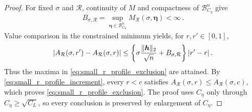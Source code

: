 \documentclass[10pt,a4paper]{amsart}
\makeatletter
\newcommand{\abs}[1]{%
	\ensuremath{%
		\if@display
		\left| #1 \right|
		\else
		\lvert #1 \rvert
		\fi
	}%
}
\newcommand*{\bb}{\boldsymbol}
\def\bh{\bb{h}}
\newcommand{\vnorm}[1]{%
	\ensuremath{%
		\if@display
		\left\| #1 \right\|
		\else
		\| #1 \|
		\fi
	}%
}
\makeatother
\begin{document}
\begin{proof}
For fixed $\sigma$ and $\mathcal R$, continuity of $M$ and compactness of
$\mathcal B^n_{C_\eta}$ give
$$
	B_{\sigma,\mathcal R}
	=
	\underset{\bb\eta\in\mathcal B^n_{C_\eta}}{\sup}
	M_{\mathcal R}(\sigma,\bb\eta)
	<
	\infty\,.
$$
Value comparison in the constrained minimum yields, for
$r,r'\in[0,1]$,
$$
	\abs{
		A_{\mathcal R}(\sigma,r')
		-
		A_{\mathcal R}(\sigma,r)
	}
	\leq
	\left\{
		\sigma\frac{\vnorm{\bh}_2}{\sqrt n}
		+
		B_{\sigma,\mathcal R}
	\right\}
	\abs{r'-r}\,.
$$
Thus the maxima in \eqref{eq:small_r_profile_exclusion} are attained. By
\eqref{eq:small_r_profile_increment}, every $r<c$ satisfies
$A_{\mathcal R}(\sigma,r)\leq A_{\mathcal R}(\sigma,c)$, which proves
\eqref{eq:small_r_profile_exclusion}. The proof uses $C_\eta$ only through
$C_\eta\geq\sqrt{C_L}$, so every conclusion is preserved by enlargement of
$C_\eta$.
\end{proof}
\end{document}
